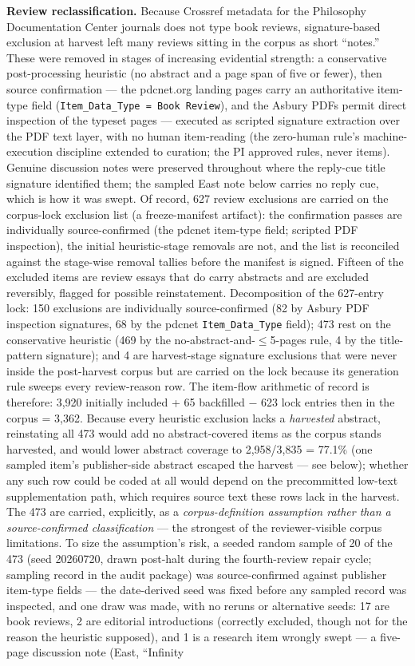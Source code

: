 \textbf{Review reclassification.} Because Crossref metadata for the Philosophy Documentation Center journals does not type book reviews, signature-based exclusion at harvest left many reviews sitting in the corpus as short ``notes.'' These were removed in stages of increasing evidential strength: a conservative post-processing heuristic (no abstract and a page span of five or fewer), then source confirmation --- the pdcnet.org landing pages carry an authoritative item-type field (\texttt{Item\_Data\_Type\ =\ Book\ Review}), and the Asbury PDFs permit direct inspection of the typeset pages --- executed as scripted signature extraction over the PDF text layer, with no human item-reading (the zero-human rule's machine-execution discipline extended to curation; the PI approved rules, never items). Genuine discussion notes were preserved throughout where the reply-cue title signature identified them; the sampled East note below carries no reply cue, which is how it was swept. Of record, 627 review exclusions are carried on the corpus-lock exclusion list (a freeze-manifest artifact): the confirmation passes are individually source-confirmed (the pdcnet item-type field; scripted PDF inspection), the initial heuristic-stage removals are not, and the list is reconciled against the stage-wise removal tallies before the manifest is signed. Fifteen of the excluded items are review essays that do carry abstracts and are excluded reversibly, flagged for possible reinstatement. Decomposition of the 627-entry lock: 150 exclusions are individually source-confirmed (82 by Asbury PDF inspection signatures, 68 by the pdcnet \texttt{Item\_Data\_Type} field); 473 rest on the conservative heuristic (469 by the no-abstract-and-$\le$5-pages rule, 4 by the title-pattern signature); and 4 are harvest-stage signature exclusions that were never inside the post-harvest corpus but are carried on the lock because its generation rule sweeps every review-reason row. The item-flow arithmetic of record is therefore: 3,920 initially included + 65 backfilled $-$ 623 lock entries then in the corpus = 3,362. Because every heuristic exclusion lacks a \emph{harvested} abstract, reinstating all 473 would add no abstract-covered items as the corpus stands harvested, and would lower abstract coverage to 2,958/3,835 = 77.1\% (one sampled item's publisher-side abstract escaped the harvest --- see below); whether any such row could be coded at all would depend on the precommitted low-text supplementation path, which requires source text these rows lack in the harvest. The 473 are carried, explicitly, as a \emph{corpus-definition assumption rather than a source-confirmed classification} --- the strongest of the reviewer-visible corpus limitations. To size the assumption's risk, a seeded random sample of 20 of the 473 (seed 20260720, drawn post-halt during the fourth-review repair cycle; sampling record in the audit package) was source-confirmed against publisher item-type fields --- the date-derived seed was fixed before any sampled record was inspected, and one draw was made, with no reruns or alternative seeds: 17 are book reviews, 2 are editorial introductions (correctly excluded, though not for the reason the heuristic supposed), and 1 is a research item wrongly swept --- a five-page discussion note (East, ``Infinity 
